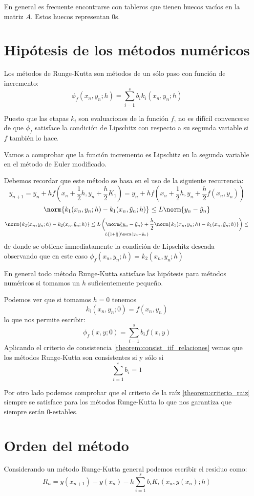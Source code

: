 \obs En general es frecuente encontrarse con tableros que tienen huecos vacíos en la matriz $A$. Estos huecos representan 0s.

\section{Hipótesis de los métodos numéricos}

Los métodos de Runge-Kutta son métodos de un sólo paso con función de incremento:
\[\phi_f(x_n,y_n;h) = \sum_{i=1}^sb_ik_i(x_n,y_n;h)\]

Puesto que las etapas $k_i$ son evaluaciones de la función $f$, no es difícil convencerse de que $\phi_f$ satisface la condición de Lipschitz con respecto a su segunda variable si $f$ también lo hace.

\begin{example}
Vamos a comprobar que la función incremento es Lipschitz en la segunda variable en el método de Euler modificado.

Debemos recordar que este método se basa en el uso de la siguiente recurrencia:
\[y_{n+1}=y_n+hf\left(x_n+\frac{1}{2}h,y_n+\frac{h}{2}K_1\right)=y_n+hf\left(x_n+\frac{1}{2}h,y_n+\frac{h}{2}f(x_n,y_n)\right)\]
\[\norm{k_1(x_n,y_n;h)-k_1(x_n,\tilde{y}_n;h)} \leq L\norm{y_n-\tilde{y}_n}\]
\[\norm{k_2(x_n,y_n;h)-k_2(x_n,\tilde{y}_n;h)} \leq L\left( \norm{y_n-\tilde{y}_n}+\frac{h}{2}\norm{k_1(x_n,y_n;h)-k_1(x_n,\tilde{y}_n;h)}\right) \leq \atop L\left(1+\frac{h}{2}\right) \norm{y_n-\tilde{y}_n}\]
de donde se obtiene inmediatamente la condición de Lipschitz deseada observando que en este caso $\phi_f(x_n,y_n;h)=k_2(x_n,y_n;h)$
\end{example}

\obs En general todo método Runge-Kutta satisface las hipótesis para métodos numéricos si tomamos un $h$ suficientemente pequeño.

Podemos ver que si tomamos $h=0$ tenemos
\[k_i(x_n,y_n;0)=f(x_n,y_n)\]
lo que nos permite escribir:
\[\phi_f(x,y;0)=\sum_{i=1}^sb_if(x,y)\]
Aplicando el criterio de consistencia \ref{theorem:consist_iif_relaciones} vemos que los métodos Runge-Kutta son consistentes si y sólo si
\[\sum_{i=1}^sb_i = 1\]

Por otro lado podemos comprobar que el criterio de la raíz \ref{theorem:criterio_raiz} siempre se satisface para los métodos Runge-Kutta lo que nos garantiza que siempre serán 0-estables.

\section{Orden del método}
Considerando un método Runge-Kutta general podemos escribir el residuo como:
\[R_n = y(x_{n+1})-y(x_n)-h \sum_{i=1}^sb_iK_i(x_n,y(x_n);h)\]

